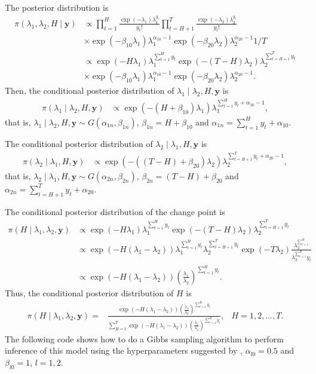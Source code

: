 The posterior distribution is
\begin{align*}
	\pi(\lambda_1,\lambda_2,H\mid \bm{y})&\propto \prod_{t=1}^{H} \frac{\exp(-\lambda_1)\lambda_1^{y_t}}{y_t!} \prod_{t=H+1}^{T}\frac{\exp(-\lambda_2)\lambda_2^{y_t}}{y_t!}\\
	&\times \exp(-\beta_{10}\lambda_1)\lambda_1^{\alpha_{10}-1} \exp(-\beta_{20}\lambda_2)\lambda_2^{\alpha_{20}-1} 1/T\\
	&\propto\exp(-H\lambda_1)\lambda_1^{\sum_{t=1}^H y_t}\exp(-(T-H)\lambda_2)\lambda_2^{\sum_{t=H+1}^T y_t}\\
	&\times \exp(-\beta_{10}\lambda_1)\lambda_1^{\alpha_{10}-1} \exp(-\beta_{20}\lambda_2)\lambda_2^{\alpha_{20}-1}.
\end{align*} 
Then, the conditional posterior distribution of $\lambda_1\mid \lambda_2,H,\bm{y}$ is 
\begin{align*}
	\pi(\lambda_1\mid \lambda_2,H,\bm{y})&\propto\exp(-(H+\beta_{10})\lambda_1)\lambda_1^{\sum_{t=1}^H y_t+\alpha_{10}-1},
\end{align*} 
that is, $\lambda_1\mid \lambda_2,H,\bm{y}\sim G(\alpha_{1n},\beta_{1n})$, $\beta_{1n}=H+\beta_{10}$ and $\alpha_{1n}=\sum_{t=1}^H y_t+\alpha_{10}$.

The conditional posterior distribution of $\lambda_2\mid \lambda_1,H,\bm{y}$ is 
\begin{align*}
	\pi(\lambda_2\mid \lambda_1,H,\bm{y})&\propto\exp(-((T-H)+\beta_{20})\lambda_2)\lambda_2^{\sum_{t=H+1}^T y_t+\alpha_{20}-1},
\end{align*} 
that is, $\lambda_2\mid \lambda_1,H,\bm{y}\sim G(\alpha_{2n},\beta_{2n})$, $\beta_{2n}=(T-H)+\beta_{20}$ and $\alpha_{2n}=\sum_{t=H+1}^T y_t+\alpha_{20}$.

The conditional posterior distribution of the change point is
\begin{align*}
	\pi(H\mid \lambda_1,\lambda_2,\bm{y})&\propto\exp(-H\lambda_1)\lambda_1^{\sum_{t=1}^H y_t}\exp(-(T-H)\lambda_2)\lambda_2^{\sum_{t=H+1}^T y_t}\\
	&\propto \exp(-H(\lambda_1-\lambda_2))\lambda_1^{\sum_{t=1}^H y_t}\lambda_2^{\sum_{t=H+1}^T y_t} \exp(-T\lambda_2) \frac{\lambda_2^{\sum_{t=1}^H}}{\lambda_2^{\sum_{t=1}^H} y_t}\\
	&\propto \exp(-H(\lambda_1-\lambda_2))\left(\frac{\lambda_1}{\lambda_2}\right)^{\sum_{t=1}^H y_t}.
\end{align*} 
Thus, the conditional posterior distribution of $H$ is
\begin{align*}
	\pi(H\mid \lambda_1,\lambda_2,\bm{y})=& \frac{\exp(-H(\lambda_1-\lambda_2))\left(\frac{\lambda_1}{\lambda_2}\right)^{\sum_{t=1}^H y_t}}{\sum_{H=1}^T \exp(-H(\lambda_1-\lambda_2))\left(\frac{\lambda_1}{\lambda_2}\right)^{\sum_{t=1}^H y_t}}, & H=1,2,\dots,T.
\end{align*}
The following code shows how to do a Gibbs sampling algorithm to perform inference of this model using the hyperparameters suggested by \cite[Chap.~7]{greenberg2012introduction}, $\alpha_{l0}=0.5$ and $\beta_{l0}=1$, $l=1,2$.

